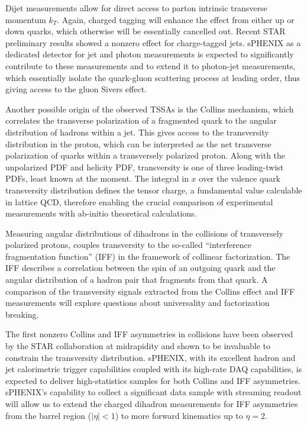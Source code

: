 Dijet measurements allow for direct access to parton intrinsic transverse momentum $k_T$. Again, charged tagging will enhance the effect from either up or down quarks, which otherwise will be essentially cancelled out. Recent STAR preliminary results showed a nonzero effect for charge-tagged jets. sPHENIX as a dedicated detector for jet and photon measurements is expected to significantly contribute to these measurements and to extend it to photon-jet measurements, which essentially isolate the quark-gluon scattering process at leading order, thus giving access to the gluon Sivers effect.

Another possible origin of the observed TSSAs is the Collins mechanism, which correlates the transverse polarization of a fragmented quark to the angular distribution of hadrons within a jet. This gives access to the transversity distribution in the proton, which can be interpreted as the net transverse polarization of quarks within a transversely polarized proton. Along with the unpolarized PDF and helicity PDF, transversity is one of three leading-twist PDFs, least known at the moment. The integral in $x$ over the valence quark transversity distribution defines the tensor charge, a fundamental value calculable in lattice QCD, therefore enabling the crucial comparison of experimental measurements with ab-initio theoretical calculations.

Measuring angular distributions of dihadrons in the collisions of
transversely polarized protons, couples transversity to the so-called
``interference fragmentation function'' (IFF) in the framework of
collinear factorization. The IFF describes a correlation between the
spin of an outgoing quark and the angular distribution of a hadron
pair that fragments from that quark.  A comparison of the transversity
signals extracted from the Collins effect and IFF measurements will
explore questions about universality and factorization breaking. 

The first nonzero Collins and IFF asymmetries in \pp collisions have
been observed by the STAR collaboration at midrapidity and shown to be
invaluable to constrain the transversity distribution. sPHENIX, with
its excellent hadron and jet calorimetric trigger capabilities coupled
with its high-rate DAQ capabilities, is expected to deliver
high-statistics samples for both Collins and IFF
asymmetries. sPHENIX's capability to collect a significant 
data sample with streaming readout will allow us to extend the charged
dihadron measurements for IFF asymmetries from the barrel region
($|\eta|<1$) to more forward kinematics up to $\eta=2$.  


